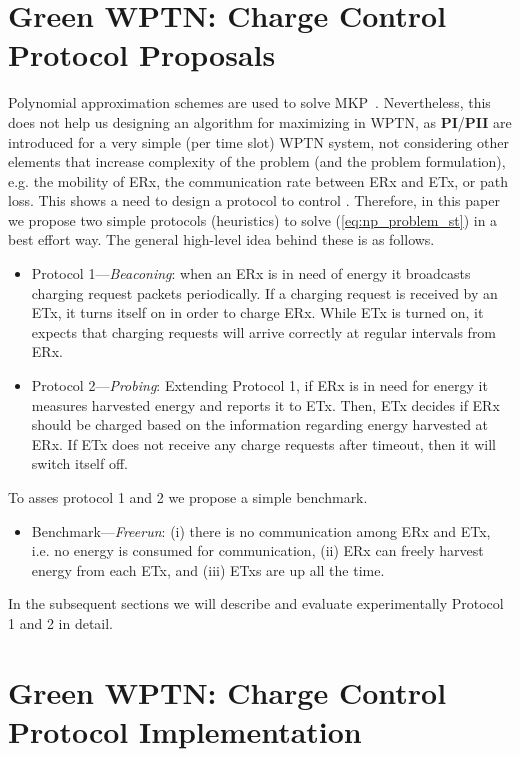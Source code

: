 \documentclass[11pt,draftclsnofoot,journal,onecolumn]{IEEEtran}
\begin{document}
\section{Green WPTN: Charge Control Protocol Proposals}
\label{sec:charger_energy_saving_protocol}

Polynomial approximation schemes are used to solve MKP~\cite[Sec. 3.1]{freville2004multidimensional}. Nevertheless, this does not help us designing an algorithm for maximizing  in WPTN, as \textbf{PI}/\textbf{PII} are introduced for a very simple (per time slot) WPTN system, not considering other elements that increase complexity of the problem (and the problem formulation), e.g. the mobility of ERx, the communication rate between ERx and ETx, or path loss. This shows a need to design a protocol to control . Therefore, in this paper we propose two simple protocols (heuristics) to solve (\ref{eq:np_problem_st}) in a best effort way. The general high-level idea behind these is as follows.

\begin{itemize}
\item Protocol 1---\emph{Beaconing}: when an ERx is in need of energy it broadcasts charging request packets periodically. If a charging request is received by an ETx, it turns itself on in order to charge ERx. While ETx is turned on, it expects that charging requests will arrive correctly at regular intervals from ERx.

\item Protocol 2---\emph{Probing}: Extending Protocol 1, if ERx is in need for energy it measures harvested energy and reports it to ETx. Then, ETx decides if ERx should be charged based on the information regarding energy harvested at ERx. If ETx does not receive any charge requests after timeout, then it will switch itself off.
\end{itemize}

To asses protocol 1 and 2 we propose a simple benchmark.

\begin{itemize}
\item Benchmark---\emph{Freerun}: (i) there is no communication among ERx and ETx, i.e. no energy is consumed for communication, (ii) ERx can freely harvest energy from each ETx, and (iii) ETxs are up all the time.
\end{itemize}
In the subsequent sections we will describe and evaluate experimentally Protocol 1 and 2 in detail.

\section{Green WPTN: Charge Control Protocol Implementation}
\label{sec:experimental_verification}
\end{document}
